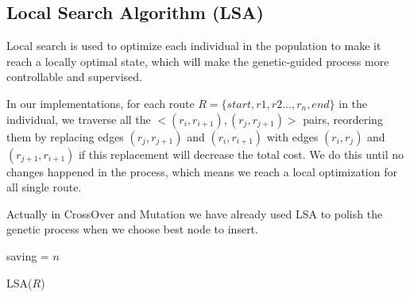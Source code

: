 \documentclass{llncs}
\begin{document}
\subsection{Local Search Algorithm (LSA)}
Local search is used to optimize each individual in the population to make it reach a locally optimal state, which will make the genetic-guided process more controllable and supervised.  

In our implementations, for each route $R = \{start,r1,r2...,r_n,end\}$ in the individual, we traverse all the $<(r_i,r_{i+1}), (r_j, r_{j+1})>$ pairs, reordering them by replacing edges 
 $ (r_j, r_{j+1})$ and  $(r_i,r_{i+1})$ with edges  $(r_i,r_{j})$ and $(r_{j+1}, r_{i+1})$ if this replacement will decrease the total cost. We do this until no changes happened in the process, which means we reach a local optimization for all single route.

Actually in CrossOver and Mutation we have already used LSA to polish the genetic process when we choose best node to insert.

\begin{minipage}[t]{0.80\textwidth}
       \begin{algorithm}[H]
             saving = $n$
             
           \caption{LSA($R$)}
        \end{algorithm}
        \end{minipage} 
\end{document}
